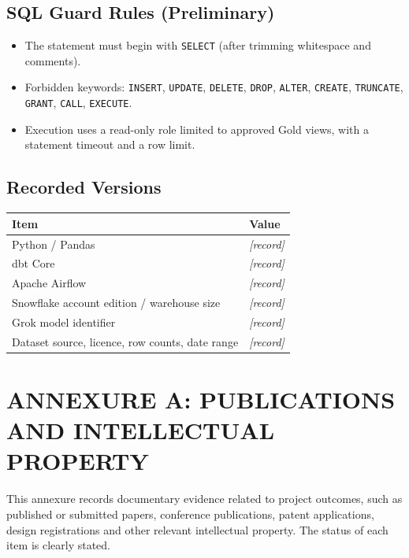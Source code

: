 \documentclass[12pt,a4paper]{report}
\newcommand{\ph}[1]{\textit{[#1]}}
\begin{document}
\section{SQL Guard Rules (Preliminary)}
\begin{itemize}[leftmargin=2em]
\item The statement must begin with \texttt{SELECT} (after trimming whitespace and comments).
\item Forbidden keywords: \texttt{INSERT}, \texttt{UPDATE}, \texttt{DELETE}, \texttt{DROP}, \texttt{ALTER}, \texttt{CREATE}, \texttt{TRUNCATE}, \texttt{GRANT}, \texttt{CALL}, \texttt{EXECUTE}.
\item Execution uses a read-only role limited to approved Gold views, with a statement timeout and a row limit.
\end{itemize}

\section{Recorded Versions}
\begin{center}
\begin{tabular}{@{}ll@{}}
\toprule
\textbf{Item} & \textbf{Value} \\
\midrule
Python / Pandas & \ph{record} \\
dbt Core & \ph{record} \\
Apache Airflow & \ph{record} \\
Snowflake account edition / warehouse size & \ph{record} \\
Grok model identifier & \ph{record} \\
Dataset source, licence, row counts, date range & \ph{record} \\
\bottomrule
\end{tabular}
\end{center}

\clearpage
\chapter*{ANNEXURE A: PUBLICATIONS AND INTELLECTUAL PROPERTY}

\noindent This annexure records documentary evidence related to project outcomes, such as published or submitted papers, conference publications, patent applications, design registrations and other relevant intellectual property. The status of each item is clearly stated.
\end{document}
